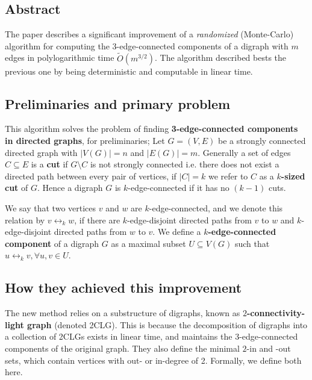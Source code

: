 \subsection{Abstract}
The paper describes a significant improvement of a \textit{randomized} (Monte-Carlo) algorithm for computing the 3-edge-connected components of a digraph
with $m$ edges in polylogarithmic time $\widetilde{O} (m^{3/2})$. The algorithm described bests the previous one by being deterministic and 
computable in linear time. 

\vspace*{0.5cm}

\subsection{Preliminaries and primary problem}
This algorithm solves the problem of finding \textbf{3-edge-connected components in directed graphs}, for preliminaries; Let $G = (V,E)$
be a strongly connected directed graph with $|V(G)| =n$ and  $|E(G)| =m$. Generally a set of edges $C \subseteq E$ is a \textbf{cut} if $G \setminus C$ is not
strongly connected i.e. there does not exist a directed path between every pair of vertices, if $|C| =k$ we refer to $C$ as a \textbf{$k$-sized cut} of $G$.
Hence a digraph $G$ is $k$-edge-connected if it has no $(k-1)$ cuts. 

\vspace*{0.2cm}

We say that two vertices $v$ and $w$ are $k$-edge-connected, and we denote this relation by $v \leftrightarrow_k w$, if there are $k$-edge-disjoint 
directed paths from $v$ to $w$ and $k$-edge-disjoint directed paths from $w$ to $v$.
We define a \textbf{$k$-edge-connected component} of a digraph $G$ as a maximal subset $U \subseteq V(G)$ such that $u \leftrightarrow_k v, \forall u,v \in U$.

\subsection{How they achieved this improvement}
The new method relies on a substructure of digraphs, known as \textbf{$2$-connectivity-light graph} (denoted 2CLG). This is because the decomposition of digraphs 
into a collection of 2CLGs exists in linear time, and maintains the $3$-edge-connected components of the original graph. They also define the minimal $2$-in 
and -out sets, which contain vertices with out- or in-degree of 2. Formally, we define both here.

